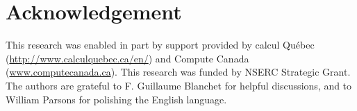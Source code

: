 \section{Acknowledgement}
This research was enabled in part by support provided by calcul Qu\'ebec (\url{http://www.calculquebec.ca/en/}) and Compute Canada (\url{www.computecanada.ca}). This research was funded by NSERC Strategic Grant. The authors are grateful to F. Guillaume Blanchet for helpful discussions, and to William Parsons for polishing the English language.
